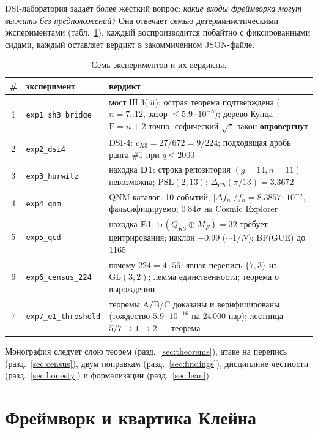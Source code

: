 \documentclass[11pt,a4paper]{article}
\theoremstyle{definition}
\newcommand{\F}{\mathrm{F}}
\begin{document}
DSI-лаборатория задаёт более жёсткий вопрос: \emph{какие входы
фреймворка могут выжить без предположений?} Она отвечает семью
детерминистическими экспериментами (табл.~\ref{tab:experiments}),
каждый воспроизводится побайтно с фиксированными сидами, каждый
оставляет вердикт в закоммиченном JSON-файле.

\begin{table}[ht]
\centering\small
\begin{tabular}{@{}clp{7.2cm}@{}}
\toprule
\# & эксперимент & вердикт \\
\midrule
1 & \texttt{exp1\_sh3\_bridge} & мост Ш.3(iii): острая теорема подтверждена ($n=7..12$, зазор $\le 5.9\cdot10^{-8}$); дерево Кунца $\F = n+2$ точно; софический $\sqrt{\varepsilon}$-закон \textbf{опровергнут} \\
2 & \texttt{exp2\_dsi4} & DSI-4: $c_{K3} = 27/672 = 9/224$; подходящая дробь ранга \#1 при $q \le 2000$ \\
3 & \texttt{exp3\_hurwitz} & находка \textbf{D1}: строка репозитория $(g{=}14, n{=}11)$ невозможна; $\mathrm{PSL}(2,13)$; $\Delta_{Ch}(\pi/13) = 3.3672$ \\
4 & \texttt{exp4\_qnm} & QNM-каталог: 10 событий; $|\Delta f_n|/f_n = 8.3857\cdot 10^{-5}$, фальсифицируемо; $0.84\sigma$ на Cosmic Explorer \\
5 & \texttt{exp5\_qcd} & находка \textbf{E1}: $\mathrm{tr}(Q_{K3}\oplus M_F) = 32$ требует центрирования; наклон $-0.99$ ($\sim 1/N$); BF(GUE) до 1165 \\
6 & \texttt{exp6\_census\_224} & почему $224 = 4\cdot 56$: явная перепись $\{7,3\}$ из $\mathrm{GL}(3,2)$; лемма единственности; теорема о вырождении \\
7 & \texttt{exp7\_e1\_threshold} & теоремы A/B/C доказаны и верифицированы (тождество $5.9\cdot 10^{-16}$ на 24\,000 пар); лестница $5/7 \to 1 \to 2$ --- теорема \\
\bottomrule
\end{tabular}
\caption{Семь экспериментов и их вердикты.}
\label{tab:experiments}
\end{table}

Монография следует слою теорем (разд.~\ref{sec:theorems}), атаке на
перепись (разд.~\ref{sec:census}), двум поправкам
(разд.~\ref{sec:findings}), дисциплине честности
(разд.~\ref{sec:honesty}) и формализации (разд.~\ref{sec:lean}).

\section{Фреймворк и квартика Клейна}\label{sec:framework}
\end{document}
